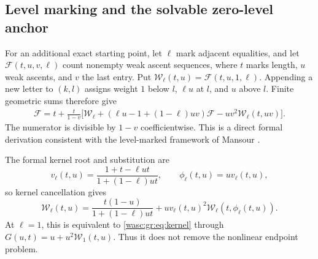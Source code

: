 \documentclass[11pt,a4paper]{article}
\theoremstyle{remark}\newtheorem{remark}[theorem]{Remark}
\numberwithin{equation}{section}
\begin{document}
\subsection{Level marking and the solvable zero-level anchor}
For an additional exact starting point, let $\ell$ mark adjacent equalities, and let $\mathcal F(t,u,v,\ell)$ count nonempty weak ascent sequences, where $t$ marks length, $u$ weak ascents, and $v$ the last entry. Put $\mathcal W_\ell(t,u)=\mathcal F(t,u,1,\ell)$. Appending a new letter to $(k,l)$ assigns weight $1$ below $l$, $\ell u$ at $l$, and $u$ above $l$. Finite geometric sums therefore give
\begin{align}\label{wasc:gr:eq:levelkernel}
\mathcal F=t+\frac{t}{1-v}\bigl[
\mathcal W_\ell+(\ell u-1+(1-\ell)uv)\mathcal F
-uv^2\mathcal W_\ell(t,uv)\bigr].
\end{align}
The numerator is divisible by $1-v$ coefficientwise. This is a direct formal derivation consistent with the level-marked framework of Mansour \cite{mansour}.

The formal kernel root and substitution are
\[
v_\ell(t,u)=\frac{1+t-\ell ut}{1+(1-\ell)ut},\qquad
\phi_\ell(t,u)=u v_\ell(t,u),
\]
so kernel cancellation gives
\begin{equation}\label{wasc:gr:eq:levelW}
\mathcal W_\ell(t,u)=\frac{t(1-u)}{1+(1-\ell)ut}
+u v_\ell(t,u)^2\mathcal W_\ell(t,\phi_\ell(t,u)).
\end{equation}
At $\ell=1$, this is equivalent to \eqref{wasc:gr:eq:kernel} through $G(u,t)=u+u^2\mathcal W_1(t,u)$. Thus it does not remove the nonlinear endpoint problem.
\end{document}
